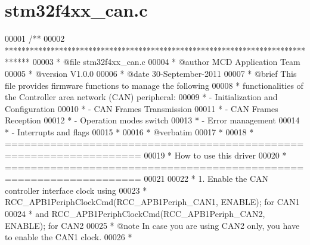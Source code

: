 \section{stm32f4xx\+\_\+can.\+c}
\label{stm32f4xx__can_8c_source}

\begin{DoxyCode}
00001 \textcolor{comment}{/**}
00002 \textcolor{comment}{  ******************************************************************************}
00003 \textcolor{comment}{  * @file    stm32f4xx\_can.c}
00004 \textcolor{comment}{  * @author  MCD Application Team}
00005 \textcolor{comment}{  * @version V1.0.0}
00006 \textcolor{comment}{  * @date    30-September-2011}
00007 \textcolor{comment}{  * @brief   This file provides firmware functions to manage the following }
00008 \textcolor{comment}{  *          functionalities of the Controller area network (CAN) peripheral:           }
00009 \textcolor{comment}{  *           - Initialization and Configuration }
00010 \textcolor{comment}{  *           - CAN Frames Transmission }
00011 \textcolor{comment}{  *           - CAN Frames Reception    }
00012 \textcolor{comment}{  *           - Operation modes switch  }
00013 \textcolor{comment}{  *           - Error management          }
00014 \textcolor{comment}{  *           - Interrupts and flags        }
00015 \textcolor{comment}{  *         }
00016 \textcolor{comment}{  *  @verbatim}
00017 \textcolor{comment}{  *                               }
00018 \textcolor{comment}{  *          ===================================================================      }
00019 \textcolor{comment}{  *                                   How to use this driver}
00020 \textcolor{comment}{  *          ===================================================================}
00021 \textcolor{comment}{                }
00022 \textcolor{comment}{  *          1.  Enable the CAN controller interface clock using }
00023 \textcolor{comment}{  *                  RCC\_APB1PeriphClockCmd(RCC\_APB1Periph\_CAN1, ENABLE); for CAN1 }
00024 \textcolor{comment}{  *              and RCC\_APB1PeriphClockCmd(RCC\_APB1Periph\_CAN2, ENABLE); for CAN2}
00025 \textcolor{comment}{  *  @note   In case you are using CAN2 only, you have to enable the CAN1 clock.}
00026 \textcolor{comment}{  *     }

\end{DoxyCode}
